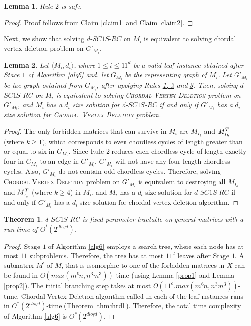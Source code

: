 \documentclass[review, 1p]{elsarticle}
\newtheorem{theorem}{Theorem}
\newtheorem{lemma}{Lemma}
\begin{document}
\begin{lemma}
Rule $2$ is safe.
\end{lemma}
\begin{proof}
Proof follows from Claim \ref{claim1} and Claim \ref{claim2}.
\end{proof}
\noindent Next, we show that solving $d$-$SC1S$-$RC$ on $M_{i}$ is equivalent to solving chordal vertex deletion problem on $G'_{M_{i}}$.
\begin{lemma}Let $\langle M_{i},d_{i} \rangle$, where $1 \leq i \leq 11^{d}$ be a valid leaf instance obtained after Stage $1$ of Algorithm \ref{alg6} and, let $G_{M_{i}}$ be the representing graph of $M_{i}$. Let $G'_{M_{i}}$ be the graph obtained from $G_{M_{i}}$, after applying Rules \hyperref[presv]{1, {2}} and \hyperref[presv]{3}. Then, solving $d$-$SC1S$-$RC$ on $M_{i}$ is equivalent to solving \textsc{Chordal Vertex Deletion} problem on $G'_{M_{i}}$, and $M_{i}$ has a $d_{i}$ size solution for $d$-$SC1S$-$RC$ if and only if $G'_{M_{i}}$ has a $d_{i}$ size solution for \textsc{Chordal Vertex Deletion} problem.
\end{lemma}
\begin{proof}
The only forbidden matrices that can survive in $M_{i}$ are $M_{I_{k}}$ and $M^{T}_{\mathsmaller{I_{k}}}$ (where $k \geq 1$), which corresponds to even chordless cycles of length greater than or equal to six in $G_{M_{i}}$. Since Rule $2$ reduces each chordless cycle of length exactly four in $G_{M_{i}}$ to an edge in $G'_{M_{i}}$, $G'_{M_{i}}$ will not have any four length chordless cycles. Also, $G'_{M_{i}}$ do not contain odd chordless cycles. Therefore, solving \textsc{Chordal Vertex Deletion} problem on $G'_{M_{i}}$ is equivalent to destroying all $M_{I_{k}}$ and $M^{T}_{\mathsmaller{I_{k}}}$ (where $k \geq 4$) in $M_{i}$, and $M_{i}$ has a $d_{i}$ size solution for $d$-$SC1S$-$RC$ if and only if $G'_{M_{i}}$ has a $d_{i}$ size solution for chordal vertex deletion algorithm.
\end{proof}
\begin{theorem} \label{rest1}
$d$-$SC1S$-$RC$ is fixed-parameter tractable on general matrices with a run-time of $O^{*}(2^{dlogd})$.
\end{theorem}
\begin{proof}
Stage $1$ of Algorithm \ref{alg6} employs a search tree, where each node has at most $11$ subproblems. Therefore, the tree has at most $11^{d}$ leaves after Stage $1$. A submatrix $M^{'}$ of $M$, that is isomorphic to one of the forbidden matrices in $X$ can be found in $O(max(m^{6}n,n^{3}m^{3}))$-time (using Lemma \ref{prop1} and Lemma \ref{prop2}). The initial branching step takes at most $O(11^{d}.max(m^{6}n,n^{3}m^{3}))$-time. Chordal Vertex Deletion algorithm called in each of the leaf instances runs in $O^{*}(2^{dlogd})$-time (Theorem \ref{thmchrdl}). Therefore, the total time complexity of Algorithm \ref{alg6} is $O^{*}(2^{dlogd})$.
\end{proof}
\end{document}
